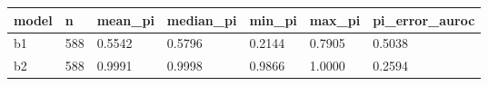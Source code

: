 \begin{tabular}{lllllll}
\hline
model & n & mean\_pi & median\_pi & min\_pi & max\_pi & pi\_error\_auroc \\
\hline
b1 & 588 & 0.5542 & 0.5796 & 0.2144 & 0.7905 & 0.5038 \\
b2 & 588 & 0.9991 & 0.9998 & 0.9866 & 1.0000 & 0.2594 \\
\hline
\end{tabular}
